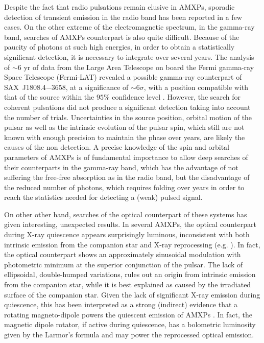 \documentclass[graybox]{svmult}
\def \saxj{{\rm SAX~J1808.4$-$3658\xspace}}
\begin{document}
Despite the fact that radio pulsations remain elusive in AMXPs, sporadic detection of transient emission in the radio band has been reported in a few cases. On the other extreme of the electromagnetic spectrum, in the gamma-ray band, searches of AMXPs counterpart is also quite difficult. Because of the paucity of photons at such high energies, in order to obtain a statistically significant detection, it is necessary to integrate over several years. The analysis of $\sim 6$ yr of data from the Large Area Telescope on board the Fermi gamma-ray Space Telescope (Fermi-LAT) revealed a possible gamma-ray counterpart of \saxj{}, at a significance of $\sim 6 \sigma$, with a position compatible with that of the source within the $95\%$ confidence level \cite{deOnaWilhelmi2016}. However, the search for coherent pulsations did not produce a significant detection taking into account the number of trials. Uncertainties in the source position, orbital motion of the pulsar as well as the intrinsic evolution of the pulsar spin, which still are not known with enough precision to maintain the phase over years, are likely the causes of the non detection. A precise knowledge of the spin and orbital parameters of AMXPs is of fundamental importance to allow deep searches of their counterparts in the gamma-ray band, which has the advantage of not suffering the free-free absorption as in the radio band, but the disadvantage of the reduced number of photons, which requires folding over years in order to reach the statistics needed for detecting a (weak) pulsed signal. 

On other other hand, searches of the optical counterpart of these systems has given interesting, unexpected results. In several AMXPs, the optical counterpart during X-ray quiescence appears surprisingly luminous, inconsistent with both intrinsic emission from the companion star and X-ray reprocessing (e.g. \cite{Homer2001,DAvanzo2009,DAvanzo2011}). In fact, the optical counterpart shows an approximately sinusoidal modulation with photometric minimum at the superior conjunction of the pulsar. The lack of ellipsoidal, double-humped variations, rules out an origin from intrinsic emission from the companion star, while it is best explained as caused by the irradiated surface of the companion star. Given the lack of significant X-ray emission during quiescence, this has been interpreted as a strong (indirect) evidence that a rotating magneto-dipole powers the quiescent emission of AMXPs \cite{Burderi2003,Campana2004}. In fact, the magnetic dipole rotator, if active during quiescence, has a bolometric luminosity given by the Larmor's formula and may power the reprocessed optical emission. 
\end{document}
